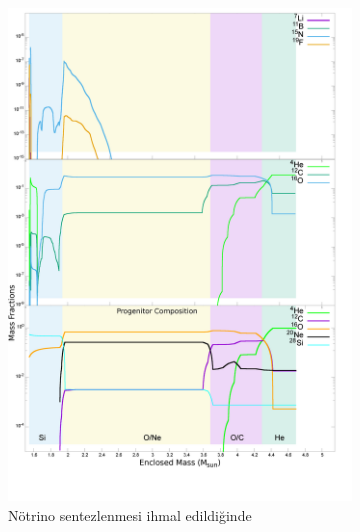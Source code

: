 \begin{figure}[hbt!]
	\centering
	\begin{subfigure}{.49\textwidth}
		\includegraphics[width=\textwidth]{figures/abundadecay_noNu_he4li7b11c12n15o16f19_hor}
		\caption[Nötrino Sentezlenmesi İhmal Edildiğinde]{Nötrino sentezlenmesi ihmal edildiğinde}
	\end{subfigure}
	\begin{subfigure}{.49\textwidth}

\end{subfigure}
\end{figure}
